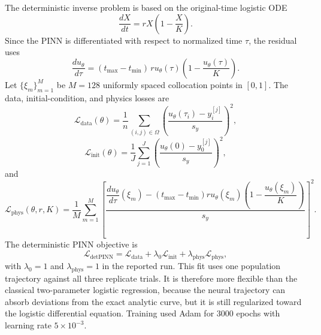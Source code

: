 The deterministic inverse problem is based on the original-time logistic ODE
$$
  \frac{dX}{dt}=rX\left(1-\frac{X}{K}\right).
$$
Since the PINN is differentiated with respect to normalized time $\tau$, the
residual uses
$$
  \frac{du_\theta}{d\tau}
  =
  (t_{\max}-t_{\min})\,
  r u_\theta(\tau)\left(1-\frac{u_\theta(\tau)}{K}\right).
$$
Let $\{\xi_m\}_{m=1}^M$ be $M=128$ uniformly spaced collocation points in
$[0,1]$. The data, initial-condition, and physics losses are
$$
  \mathcal L_{\mathrm{data}}(\theta)
  =
  \frac{1}{n}
  \sum_{(i,j)\in\Omega}
  \left(
    \frac{u_\theta(\tau_i)-y_i^{[j]}}{s_y}
  \right)^2,
$$
$$
  \mathcal L_{\mathrm{init}}(\theta)
  =
  \frac{1}{J}
  \sum_{j=1}^J
  \left(
    \frac{u_\theta(0)-y_0^{[j]}}{s_y}
  \right)^2,
$$
and
$$
  \mathcal L_{\mathrm{phys}}(\theta,r,K)
  =
  \frac{1}{M}
  \sum_{m=1}^M
  \left[
    \frac{
      \dfrac{du_\theta}{d\tau}(\xi_m)
      -
      (t_{\max}-t_{\min})r u_\theta(\xi_m)
      \left(1-\dfrac{u_\theta(\xi_m)}{K}\right)
    }{s_y}
  \right]^2 .
$$
The deterministic PINN objective is
$$
  \mathcal L_{\mathrm{detPINN}}
  =
  \mathcal L_{\mathrm{data}}
  +
  \lambda_0\mathcal L_{\mathrm{init}}
  +
  \lambda_{\mathrm{phys}}\mathcal L_{\mathrm{phys}},
$$
with $\lambda_0=1$ and $\lambda_{\mathrm{phys}}=1$ in the reported run. This
fit uses one population trajectory against all three replicate trials. It is
therefore more flexible than the classical two-parameter logistic regression,
because the neural trajectory can absorb deviations from the exact analytic
curve, but it is still regularized toward the logistic differential equation.
Training used Adam for 3000 epochs with learning rate $5\times10^{-3}$.

